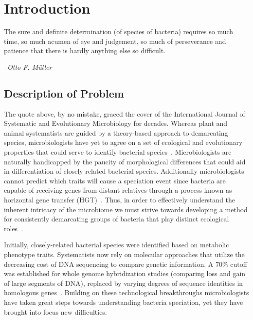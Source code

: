 \gobbletocpage
\chapter{Introduction}
\restoretocpage

\begin{shadequote}
The sure and definite determination (of species of bacteria) requires so much time, so much acumen of eye and judgement, so much of perseverance and patience that there is hardly anything else so \mbox{difficult}. \par--\emph{Otto F. M\"uller}
\end{shadequote}

\section{Description of Problem}
The quote above, by no mistake, graced the cover of the International Journal of Systematic and Evolutionary Microbiology for decades.
Whereas plant and animal systematists are guided by a theory-based approach to demarcating species, microbiologists have yet to agree on a set of ecological and evolutionary properties that could serve to identify bacterial species~\cite{cohan2007systematics}.
Microbiologists are naturally handicapped by the paucity of morphological differences that could aid in differentiation of closely related bacterial species.
Additionally microbiologists cannot predict which traits will cause a speciation event since bacteria are capable of receiving genes from distant relatives through a process known as horizontal gene transfer (HGT)~\cite{cohan2007systematics}.
Thus, in order to effectively understand the inherent intricacy of the microbiome we must strive towards developing a method for consistently demarcating groups of bacteria that play distinct ecological roles~\cite{koeppel2008identifying}.

Initially, closely-related bacterial species were identified based on metabolic phenotype traits.
Systematists now rely on molecular approaches that utilize the decreasing cost of DNA sequencing to compare genetic information.
A 70\% cutoff was established for whole genome hybridization studies (comparing loss and gain of large segments of DNA), replaced by varying degrees of sequence identities in homologous genes~\cite{cohan2007systematics,carlo,staley1997biodiversity}.
Building on these technological breakthroughs microbiologists have taken great steps towards understanding bacteria speciation, yet they have brought into focus new difficulties.

